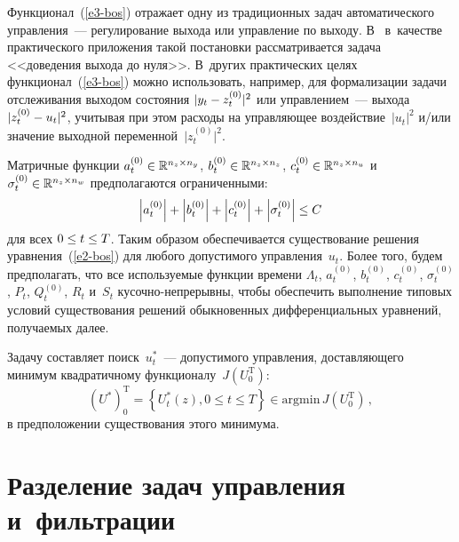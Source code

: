 \begin{multicols}{2}
     Функционал~(\ref{e3-bos}) отражает одну из традиционных задач 
автоматического управления~--- регулирование выхода или управление по 
выходу. В~\cite{12-bos} в~качестве практического приложения такой 
постановки рассматривается задача <<доведения выхода до нуля>>. 
В~других практических целях функционал~(\ref{e3-bos}) можно 
использовать, например, для формализации задачи отслеживания выходом 
состояния $\vert y_t\hm- z_t^{(0)}\vert^2$ или управлением~--- выхода $\vert 
z_t^{(0)}\hm- u_t\vert^2$, учитывая при этом расходы на управляющее 
воздействие~$\vert u_t\vert^2$ и/или значение выходной переменной~$\vert 
z_t^{(0)}\vert^2$.
     
     Матричные функции $a_t^{(0)}\hm\in \mathbb{R}^{n_z\times n_y}$, 
$b_t^{(0)}\hm\in \mathbb{R}^{n_z\times n_z}$, $c_t^{(0)}\hm\in 
\mathbb{R}^{n_z\times n_u}$ и~$\sigma_t^{(0)}\hm\in \mathbb{R}^{n_z\times 
n_w}$ предполагаются ограниченными: 
$$
\left\vert a_t^{(0)}\right\vert + 
\left\vert b_t^{(0)}\right\vert + \left\vert c_t^{(0)}\right\vert + \left\vert 
\sigma_t^{(0)}\right\vert \hm\leq C
$$ 
для всех $0\hm\leq t\hm\leq T$. Таким 
образом обеспечивается существование решения уравнения~(\ref{e2-bos}) 
для любого допустимого управления~$u_t$. Более того, будем предполагать, 
что все используемые функции времени $\Lambda_t$, $a_t^{(0)}$, $b_t^{(0)}$, 
$c_t^{(0)}$, $\sigma_t^{(0)}$, $P_t$, $Q_t^{(0)}$, $R_t$ и~$S_t$  
     ку\-соч\-но-не\-пре\-рыв\-ны, чтобы обеспечить выполнение типовых 
условий существования решений обыкновенных дифференциальных 
уравнений, получаемых далее.
     
     Задачу составляет поиск~$u_t^*$~--- допустимого управ\-ле\-ния, 
доставляющего минимум квадратичному функционалу~$J(U_0^{\mathrm{T}})$: 
     \begin{equation*}
     \left( U^*\right)_0^{\mathrm{T}}=\left\{ U_t^*(z), 0\leq t\leq T\right\} \in 
\mathrm{argmin}\,J(U_0^{\mathrm{T}})\,,
     \end{equation*}
в предположении существования этого минимума.

\vspace*{-9pt}

\section{Разделение задач управления и~фильтрации}

\vspace*{-3pt}


\end{multicols}
